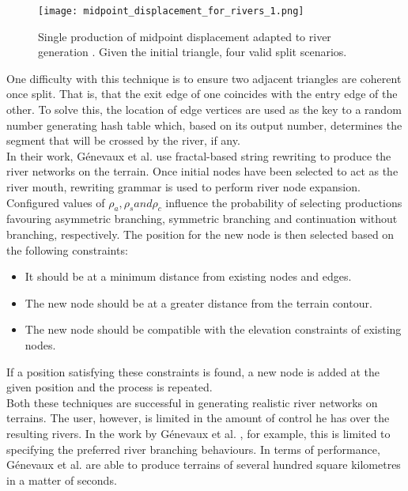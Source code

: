 \begin{figure}[h]
  \centering
	\label{Single production of midpoint displacement adapted to river generation. Given the initial triangle, four valid split scenarios. }
	\texttt{[image: midpoint\_displacement\_for\_rivers\_1.png]}
	\caption{Single production of midpoint displacement adapted to river generation \cite{Prusinkiewicz1993}. Given the initial triangle, four valid split scenarios.}
\end{figure}

One difficulty with this technique is to ensure two adjacent triangles are coherent once split. That is, that the exit edge of one coincides with the entry edge of the other. To solve this, the location of edge vertices are used as the key to a random number generating hash table which, based on its output number, determines the segment that will be crossed by the river, if any.  \\

In their work, Génevaux et al. \cite{Genevaux2013} use fractal-based string rewriting to produce the river networks on the terrain. Once initial nodes have been selected to act as the river mouth, rewriting grammar is used to perform river node expansion. Configured values of $\rho_{a}, \rho_{s} and \rho_{c}$ influence the probability of selecting productions favouring asymmetric branching, symmetric branching and continuation without branching, respectively. The position for the new node is then selected based on the following constraints:
\begin{itemize}
\item It should be at a minimum distance from existing nodes and edges.
\item The new node should be at a greater distance from the terrain contour.
\item The new node should be compatible with the elevation constraints of existing nodes.
\end{itemize}
If a position satisfying these constraints is found, a new node is added at the given position and the process is repeated.\\

Both these techniques are successful in generating realistic river networks on terrains. The user, however, is limited in the amount of control he has over the resulting rivers. In the work by Génevaux et al. \cite{Genevaux2013}, for example, this is limited to specifying the preferred river branching behaviours. In terms of performance, Génevaux et al. \cite{Genevaux2013} are able to produce terrains of several hundred square kilometres in a matter of seconds.

